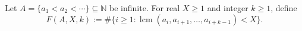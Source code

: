 Let \(A=\{a_1<a_2<\cdots\}\subseteq\mathbb{N}\) be infinite.
For real \(X\ge1\) and integer \(k\ge1\), define
\[
  F(A,X,k) := \#\Big\{ i\ge1 : \operatorname{lcm}(a_i,a_{i+1},\dots,a_{i+k-1}) < X\Big\}.
\]
